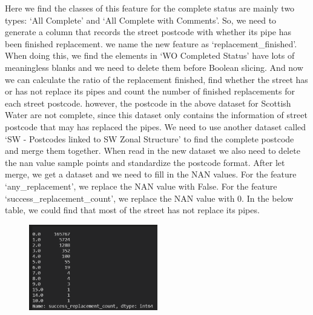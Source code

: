 \documentclass[11pt,twoside]{article}
\numberwithin{Theorem}{section}
\numberwithin{Definition}{section}
\numberwithin{Lemma}{section}
\numberwithin{Algorithm}{section}
\numberwithin{equation}{section}
\begin{document}
Here we find the classes of this feature for the complete status are mainly two types: ‘All Complete’ and ‘All Complete with Comments’. So, we need to generate a column that records the street postcode with whether its pipe has been finished replacement. we name the new feature as ‘replacement\_finished’. When doing this, we find the elements in ‘WO Completed Status’ have lots of meaningless blanks and we need to delete them before Boolean slicing. And now we can calculate the ratio of the replacement finished, find whether the street has or has not replace its pipes and count the number of finished replacements for each street postcode. however, the postcode in the above dataset for Scottish Water are not complete, since this dataset only contains the information of street postcode that may has replaced the pipes. We need to use another dataset called ‘SW - Postcodes linked to SW Zonal Structure’ to find the complete postcode and merge them together. When read in the new dataset we also need to delete the nan value sample points and standardize the postcode format. After let merge, we get a dataset and we need to fill in the NAN values. For the feature ‘any\_replacement’, we replace the NAN value with False. For the feature ‘success\_replacement\_count’, we replace the NAN value with 0. In the below table, we could find that most of the street has not replace its pipes.

\begin{figure}[!ht]
    \centering
    \includegraphics[width=0.5\textwidth]{p11.png}
    \end{figure}

\clearpage



\clearpage
\end{document}
